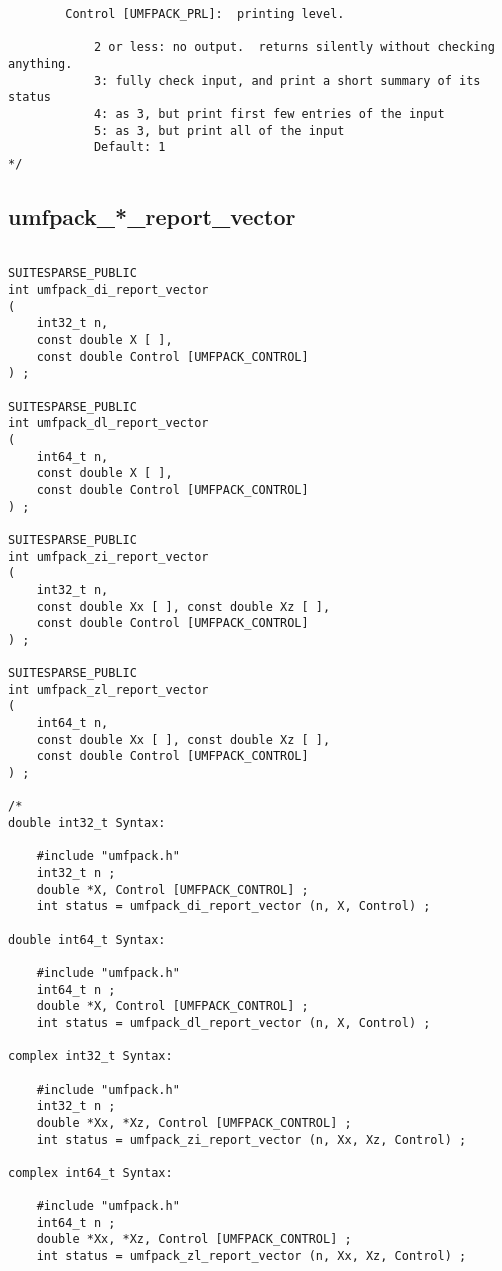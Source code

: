 \documentclass[11pt]{article}
\begin{document}
{\begin{verbatim}
        Control [UMFPACK_PRL]:  printing level.

            2 or less: no output.  returns silently without checking anything.
            3: fully check input, and print a short summary of its status
            4: as 3, but print first few entries of the input
            5: as 3, but print all of the input
            Default: 1
*/
\end{verbatim}
}

\newpage
\subsection{umfpack\_*\_report\_vector}

{\footnotesize
\begin{verbatim}

SUITESPARSE_PUBLIC
int umfpack_di_report_vector
(
    int32_t n,
    const double X [ ],
    const double Control [UMFPACK_CONTROL]
) ;

SUITESPARSE_PUBLIC
int umfpack_dl_report_vector
(
    int64_t n,
    const double X [ ],
    const double Control [UMFPACK_CONTROL]
) ;

SUITESPARSE_PUBLIC
int umfpack_zi_report_vector
(
    int32_t n,
    const double Xx [ ], const double Xz [ ],
    const double Control [UMFPACK_CONTROL]
) ;

SUITESPARSE_PUBLIC
int umfpack_zl_report_vector
(
    int64_t n,
    const double Xx [ ], const double Xz [ ],
    const double Control [UMFPACK_CONTROL]
) ;

/*
double int32_t Syntax:

    #include "umfpack.h"
    int32_t n ;
    double *X, Control [UMFPACK_CONTROL] ;
    int status = umfpack_di_report_vector (n, X, Control) ;

double int64_t Syntax:

    #include "umfpack.h"
    int64_t n ;
    double *X, Control [UMFPACK_CONTROL] ;
    int status = umfpack_dl_report_vector (n, X, Control) ;

complex int32_t Syntax:

    #include "umfpack.h"
    int32_t n ;
    double *Xx, *Xz, Control [UMFPACK_CONTROL] ;
    int status = umfpack_zi_report_vector (n, Xx, Xz, Control) ;

complex int64_t Syntax:

    #include "umfpack.h"
    int64_t n ;
    double *Xx, *Xz, Control [UMFPACK_CONTROL] ;
    int status = umfpack_zl_report_vector (n, Xx, Xz, Control) ;


\end{verbatim}}
\end{document}
